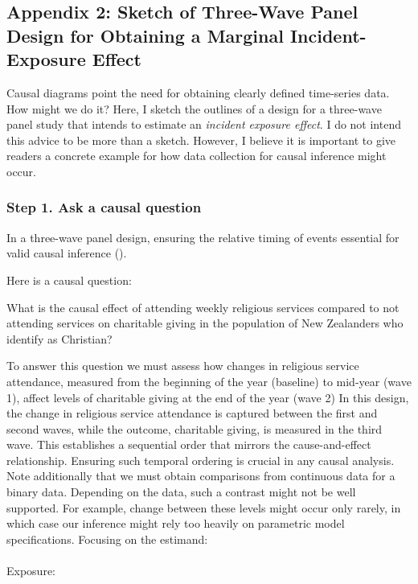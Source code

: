 \documentclass[
  singlecolumn]{article}
\makeatletter
\let\oldparagraph\paragraph
\renewcommand{\paragraph}{
    \@ifstar
      \xxxParagraphStar
      \xxxParagraphNoStar
  }
\newcommand{\xxxParagraphStar}[1]{\oldparagraph*{#1}\mbox{}}
\newcommand{\xxxParagraphNoStar}[1]{\oldparagraph{#1}\mbox{}}
\makeatother
\begin{document}
\subsection{Appendix 2: Sketch of Three-Wave Panel Design for Obtaining
a Marginal Incident-Exposure
Effect}\label{appendix-2-sketch-of-three-wave-panel-design-for-obtaining-a-marginal-incident-exposure-effect}

Causal diagrams point the need for obtaining clearly defined time-series
data. How might we do it? Here, I sketch the outlines of a design for a
three-wave panel study that intends to estimate an \emph{incident
exposure effect}. I do not intend this advice to be more than a sketch.
However, I believe it is important to give readers a concrete example
for how data collection for causal inference might occur.

\subsubsection{Step 1. Ask a causal
question}\label{step-1.-ask-a-causal-question}

In a three-wave panel design, ensuring the relative timing of events
essential for valid causal inference
().

Here is a causal question:

What is the causal effect of attending weekly religious services
compared to not attending services on charitable giving in the
population of New Zealanders who identify as Christian?

To answer this question we must assess how changes in religious service
attendance, measured from the beginning of the year (baseline) to
mid-year (wave 1), affect levels of charitable giving at the end of the
year (wave 2) In this design, the change in religious service attendance
is captured between the first and second waves, while the outcome,
charitable giving, is measured in the third wave. This establishes a
sequential order that mirrors the cause-and-effect relationship.
Ensuring such temporal ordering is crucial in any causal analysis. Note
additionally that we must obtain comparisons from continuous data for a
binary data. Depending on the data, such a contrast might not be well
supported. For example, change between these levels might occur only
rarely, in which case our inference might rely too heavily on parametric
model specifications. Focusing on the estimand:

\paragraph{Exposure:}\label{exposure}
\end{document}
